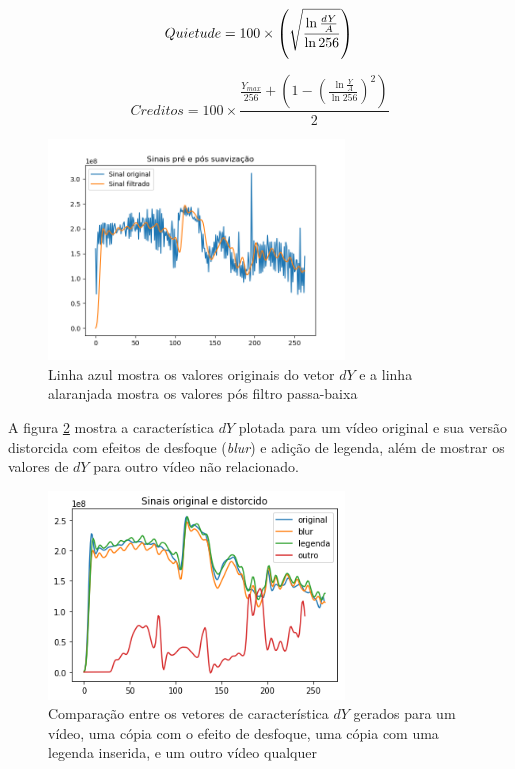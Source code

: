   \begin{equation}
    \label{eq:framediff-stillness}
    Quietude = 100 \times \left(\sqrt{\frac{\ln\frac{dY}{A}}{\ln256}}\right) \\
  \end{equation}

  \begin{equation}
    \label{eq:framediff-credits}
    Creditos = 100 \times \frac{\frac{Y_{max}}{256} + \left( 1 - \left( \frac{\ln\frac{Y}{A}}{\ln256} \right)^2\right)}{2}
  \end{equation}


\begin{figure}[h]
  \includegraphics[width=0.7\textwidth]{dados/figuras/filtro_passa_baixa}
  \caption{Linha azul mostra os valores originais do vetor $dY$ e a linha alaranjada mostra os valores pós filtro passa-baixa}
  \label{fig:framediff-passa-baixa}
\end{figure}


A figura \ref{fig:framediff-comparacao} mostra a característica $dY$ plotada para um vídeo original e sua versão distorcida com efeitos de desfoque (\textit{blur}) e adição de legenda, além de mostrar os valores de $dY$ para outro vídeo não relacionado.

\begin{figure}[h]
  \includegraphics[width=0.7\textwidth]{dados/figuras/dy}
  \caption{Comparação entre os vetores de característica $dY$ gerados para um vídeo, uma cópia com o efeito de desfoque, uma cópia com uma legenda inserida, e um outro vídeo qualquer}
  \label{fig:framediff-comparacao}
\end{figure}


